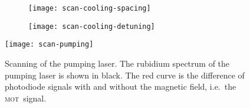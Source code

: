 \documentclass[11pt, english, fleqn, DIV=15, headinclude, BCOR=2cm]{scrreprt}
\newcommand\mot{\textsc{mot}}
\begin{document}
\begin{figure}
    \centering
    \begin{subfigure}[c]{0.48\linewidth}
        \centering
        \texttt{[image: scan-cooling-spacing]}
        \caption{%
            }
        \label{fig:/1}
    \end{subfigure}
    \hfill
    \begin{subfigure}[c]{0.48\linewidth}
        \centering
        \texttt{[image: scan-cooling-detuning]}
        \caption{%
            }
        \label{fig:/2}
    \end{subfigure}
    \caption{%
        }
    \label{fig:}
\end{figure}

\begin{figure}
    \centering
    \texttt{[image: scan-pumping]}
    \caption{%
        Scanning of the pumping laser. The rubidium spectrum of the pumping
        laser is shown in black. The red curve is the difference of photodiode
        signals with and without the magnetic field, i.e.\ the \mot\ signal.
    }
    \label{fig:scan-pumping}
\end{figure}
\end{document}
